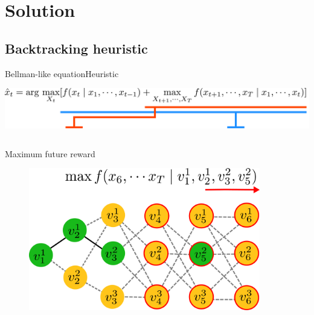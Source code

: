 \section{Solution}

\subsection{Backtracking heuristic}

\begin{frame}{Bellman-like equation}{Heuristic}
	
	
	\centering
	\includegraphics[width = \textwidth]{./figure/arg_equation}
	
	\begin{columns}
		\begin{block}{Maximum future reward}
			\begin{figure}
				\centering
				\includegraphics[width = 0.9\textwidth]{./figure/DefineFuncH}
			\end{figure}
		\end{block}
		

\end{columns}
\end{frame}
